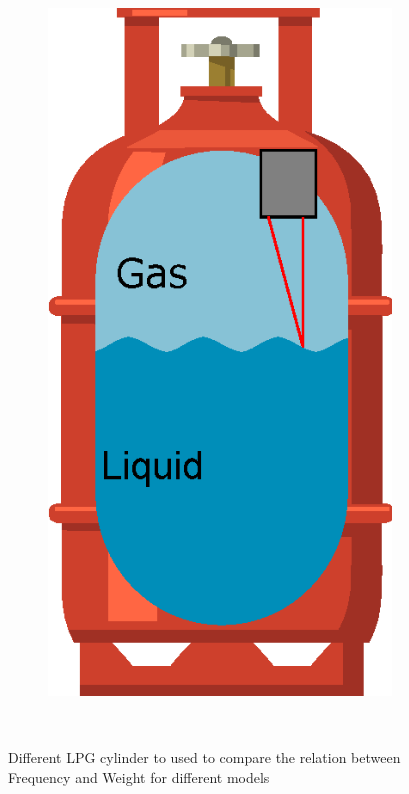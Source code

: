 \begin{figure}[]
\begin{subfigure}{0.15\textwidth}
        \caption{}{}
    \end{subfigure}
    \begin{subfigure}{0.15\textwidth}
        \centering
        \includegraphics[width=\linewidth]{Chapters/2CHP/Diagrams/bottleBaseoptical.eps}
        \caption{}{}
    \end{subfigure}
    \caption{Different LPG cylinder to used to compare the relation between Frequency and Weight for different models}{~\cite{wuLiquidLevelDetector2014b}}
 \end{figure}
